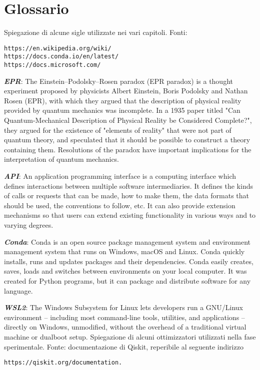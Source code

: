 \chapter{Glossario}

Spiegazione di alcune sigle utilizzate nei vari capitoli.
\newline
Fonti:
\begin{verbatim}
https://en.wikipedia.org/wiki/
https://docs.conda.io/en/latest/
https://docs.microsoft.com/
\end{verbatim}

\textbf{\textit{EPR}}: The Einstein–Podolsky–Rosen paradox (EPR paradox) is a thought experiment proposed by physicists Albert Einstein, Boris Podolsky and Nathan Rosen (EPR), with which they argued that the description of physical reality provided by quantum mechanics was incomplete. In a 1935 paper titled "Can Quantum-Mechanical Description of Physical Reality be Considered Complete?", they argued for the existence of "elements of reality" that were not part of quantum theory, and speculated that it should be possible to construct a theory containing them. Resolutions of the paradox have important implications for the interpretation of quantum mechanics.

\textbf{\textit{API}}: An application programming interface is a computing interface which defines interactions between multiple software intermediaries. It defines the kinds of calls or requests that can be made, how to make them, the data formats that should be used, the conventions to follow, etc. It can also provide extension mechanisms so that users can extend existing functionality in various ways and to varying degrees.

\textbf{\textit{Conda}}: Conda is an open source package management system and environment management system that runs on Windows, macOS and Linux. Conda quickly installs, runs and updates packages and their dependencies. Conda easily creates, saves, loads and switches between environments on your local computer. It was created for Python programs, but it can package and distribute software for any language.

\textbf{\textit{WSL2}}: The Windows Subsystem for Linux lets developers run a GNU/Linux environment -- including most command-line tools, utilities, and applications -- directly on Windows, unmodified, without the overhead of a traditional virtual machine or dualboot setup.
\newline\newline
Spiegazione di alcuni ottimizzatori utilizzati nella fase sperimentale.
\newline
Fonte: documentazione di Qiskit, reperibile al seguente indirizzo
\begin{verbatim}
https://qiskit.org/documentation.
\end{verbatim}

